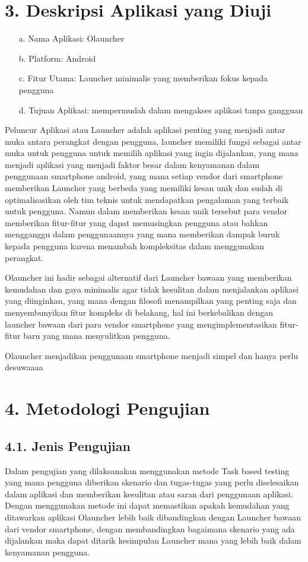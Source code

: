 \documentclass[a4paper, 12pt]{article}
\begin{document}
\section*{3. Deskripsi Aplikasi yang Diuji}

\begin{itemize}[leftmargin=*]
\item[a.] Nama Aplikasi: Olauncher
\item[b.] Platform: Android
\item[c.] Fitur Utama: Launcher minimalis yang memberikan fokus kepada pengguna
\item[d.] Tujuan Aplikasi: mempermudah dalam mengakses aplikasi tanpa gangguan
\end{itemize}

Peluncur Aplikasi atau Launcher adalah aplikasi penting yang menjadi antar muka antara perangkat dengan pengguna, launcher memiliki fungsi sebagai antar muka untuk pengguna untuk memilih aplikasi yang ingin dijalankan, yang mana menjadi aplikasi yang menjadi faktor besar dalam kenyamanan dalam penggunaan smartphone android, yang mana setiap vendor dari smartphone memberikan Launcher yang berbeda yang memiliki kesan unik dan sudah di optimalisasikan oleh tim teknis untuk mendapatkan pengalaman yang terbaik untuk pengguna. Namun dalam memberikan kesan unik tersebut para vendor memberikan fitur-fitur yang dapat memusingkan pengguna atau bahkan mengganggu dalam penggunaannya yang mana memberikan dampak buruk kepada pengguna karena menambah kompleksitas dalam menggunakan perangkat. 

Olauncher ini hadir sebagai alternatif dari Launcher bawaan yang memberikan kemudahan dan gaya minimalis agar tidak kesulitan dalam menjalankan aplikasi yang diinginkan, yang mana dengan filosofi menampilkan yang penting saja dan menyembunyikan fitur kompleks di belakang, hal ini berkebalikan dengan launcher bawaan dari para vendor smartphone yang mengimplementasikan fitur-fitur baru yang mana menyulitkan pengguna.

Olauncher menjadikan penggunaan smartphone menjadi simpel dan hanya perlu desuwaaaa


\section*{4. Metodologi Pengujian}
\subsection*{4.1. Jenis Pengujian}
Dalam pengujian yang dilaksanakan menggunakan metode Task based testing yang mana pengguna diberikan skenario dan tugas-tugas yang perlu diselesaikan dalam aplikasi dan memberikan kesulitan atau saran dari penggunaan aplikasi. 
  Dengan menggunakan metode ini dapat memastikan apakah kemudahan yang ditawarkan aplikasi Olauncher lebih baik dibandingkan dengan Launcher bawaan dari vendor smartphone, dengan membandingkan bagaimana skenario yang ada dijalankan maka dapat ditarik kesimpulan Launcher mana yang lebih baik dalam kenyamanan pengguna.
\end{document}
